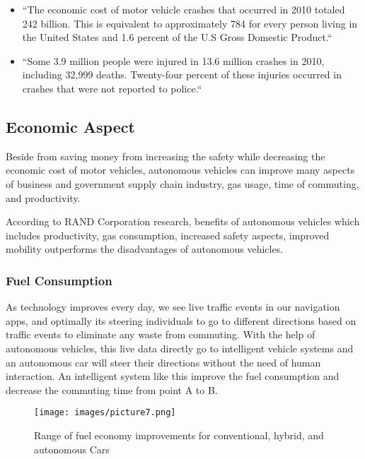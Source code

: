 \documentclass[sigconf]{acmart}
\begin{document}
\begin{itemize}

\item ``The economic cost of motor vehicle crashes that occurred in 2010 totaled 242 billion. This is equivalent to approximately 784 for every person living in the United States and 1.6 percent of the U.S Gross Domestic Product.``\cite{lawrance}

\item ``Some 3.9 million people were injured in 13.6 million cr\-as\-hes in 2010, including 32,999 deaths. Twenty-four percent of these injuries occurred in crashes that were not reported to police.``\cite{lawrance}

\end{itemize}


\subsection{Economic Aspect}
Beside from saving money from increasing the safety while decreasing the economic cost of motor vehicles, autonomous vehicles can improve many aspects of business and government supply chain industry, gas usage, time of commuting, and productivity.

\par According to RAND Corporation research, benefits of autonomous vehicles which includes productivity, gas consumption, increased safety aspects, improved mobility outperforms the disadvantages of autonomous vehicles.\cite{RAND}

\subsubsection{Fuel Consumption}As technology improves every day, we see live traffic events in our navigation apps, and optimally its steering individuals to go to different directions based on traffic events to eliminate any waste from commuting. With the help of autonomous vehicles, this live data directly go to intelligent vehicle systems and an autonomous car will steer their directions without the need of human interaction. An intelligent system like this improve the fuel consumption and decrease the commuting time from point A to B.

\begin{figure}[!ht]
  \centering
      \texttt{[image: images/picture7.png]}
  \caption{Range of fuel economy improvements for conventional, hybrid, and autonomous Cars}\label{F:fuelconsumption}
\end{figure}
\end{document}

